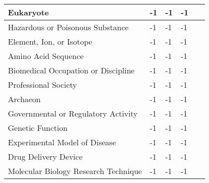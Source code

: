 \documentclass[10.7pt,]{article}
\begin{document}
\begin{longtable}{|l|p{0.3cm}|p{0.3cm}|p{0.3cm}|p{7.9cm}|}
        Eukaryote & -1 & -1 & -1 & ~ \\ \hline
        Hazardous or Poisonous Substance & -1 & -1 & -1 & ~ \\ \hline
        Element, Ion, or Isotope & -1 & -1 & -1 & ~ \\ \hline
        Amino Acid Sequence & -1 & -1 & -1 & ~ \\ \hline
        Biomedical Occupation or Discipline & -1 & -1 & -1 & ~ \\ \hline
        Professional Society & -1 & -1 & -1 & ~ \\ \hline
        Archaeon & -1 & -1 & -1 & ~ \\ \hline
        Governmental or Regulatory Activity & -1 & -1 & -1 & ~ \\ \hline
        Genetic Function & -1 & -1 & -1 & ~ \\ \hline
        Experimental Model of Disease & -1 & -1 & -1 & ~ \\ \hline
        Drug Delivery Device & -1 & -1 & -1 & ~ \\ \hline
        Molecular Biology Research Technique & -1 & -1 & -1 & ~ \\ \hline
\end{longtable}
%
%
%


\end{document}
